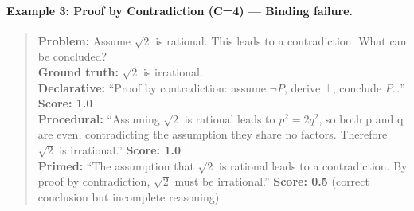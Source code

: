 \documentclass{article}
\begin{document}
\paragraph{Example 3: Proof by Contradiction (C=4) --- Binding failure.}
\begin{quote}
\small
\textbf{Problem:} Assume $\sqrt{2}$ is rational. This leads to a contradiction. What can be concluded?\\
\textbf{Ground truth:} $\sqrt{2}$ is irrational.\\
\textbf{Declarative:} ``Proof by contradiction: assume $\neg P$, derive $\bot$, conclude $P$\ldots'' \textbf{Score: 1.0}\\
\textbf{Procedural:} ``Assuming $\sqrt{2}$ is rational leads to $p^2 = 2q^2$, so both p and q are even, contradicting the assumption they share no factors. Therefore $\sqrt{2}$ is irrational.'' \textbf{Score: 1.0}\\
\textbf{Primed:} ``The assumption that $\sqrt{2}$ is rational leads to a contradiction. By proof by contradiction, $\sqrt{2}$ must be irrational.'' \textbf{Score: 0.5} (correct conclusion but incomplete reasoning)
\end{quote}
\end{document}
